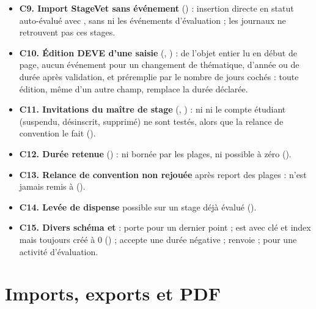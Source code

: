 \documentclass[11pt,a4paper]{article}
\newcommand{\grav}[1]{\textbf{\textcolor{#1}{\textbullet}}}
\newcommand{\mineure}{\grav{gray}}
\begin{document}
\begin{itemize}
    \og Validée par X\fg{} sur une demande qui attend de nouveau le référent.
  \item[\mineure] \textbf{C9. Import StageVet sans événement} () :
    insertion directe en statut auto-évalué avec , sans  ni
    les événements d'évaluation ; les journaux ne retrouvent pas ces stages.
  \item[\mineure] \textbf{C10. Édition DEVE d'une saisie} (,
    ) :  de l'objet entier lu en début de page,
    aucun événement pour un changement de thématique, d'année ou de durée après validation, et
     préremplie par le nombre de jours cochés : toute édition, même d'un
    autre champ, remplace la durée déclarée.
  \item[\mineure] \textbf{C11. Invitations du maître de stage}
    (, ) : ni
     ni le compte étudiant (suspendu, désinscrit, supprimé) ne sont testés, alors
    que la relance de convention le fait ().
  \item[\mineure] \textbf{C12. Durée retenue} () : ni bornée par les
    plages, ni possible à zéro ().
  \item[\mineure] \textbf{C13. Relance de convention non rejouée} après report des plages :
     n'est jamais remis à  ().
  \item[\mineure] \textbf{C14. Levée de dispense} possible sur un stage déjà évalué
    ().
  \item[\mineure] \textbf{C15. Divers schéma et } :  porte
     pour un dernier point  ;
     est  avec clé et index mais toujours créé à 0
    () ;  accepte une durée négative ;
     renvoie  ;  pour une
    activité d'évaluation.
\end{itemize}

\section{Imports, exports et PDF}
\end{document}
